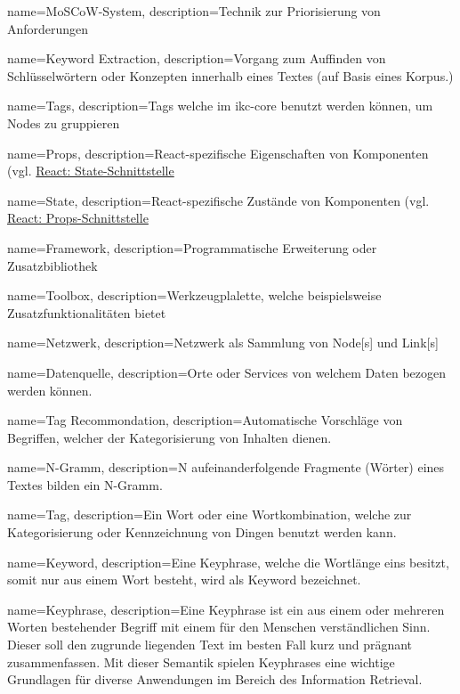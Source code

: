 {
    name=MoSCoW-System,
    description={Technik zur Priorisierung von Anforderungen}
    \cite{moscow:hardvard}
}

{
    name=Keyword Extraction,
    description={Vorgang zum Auffinden von Schlüsselwörtern oder Konzepten innerhalb eines Textes (auf Basis eines Korpus.)}
}

{
    name=Tags,
    description={Tags welche im \gls{ikc-core} benutzt werden können, um Nodes zu gruppieren}
}

{
    name=Props,
    description={React-spezifische Eigenschaften von Komponenten (vgl. \hyperref[props]{React: State-Schnittstelle}}
}

{
    name=State,
    description={React-spezifische Zustände von Komponenten (vgl. \hyperref[props]{React: Props-Schnittstelle}}
}

{
    name=Framework,
    description={Programmatische Erweiterung oder Zusatzbibliothek}
}

{
    name=Toolbox,
    description={Werkzeugplalette, welche beispielsweise Zu\-satz\-funk\-tio\-na\-li\-tät\-en bietet}
}

{
    name=Netzwerk,
    description={Netzwerk als Sammlung von \gls{Node}[s] und \gls{Link}[s]}
}

{
    name=Datenquelle,
    description={Orte oder Services von welchem Daten bezogen werden können.}
}

{
    name=Tag Recommondation,
    description={Automatische Vorschläge von Begriffen, welcher der Kategorisierung von Inhalten dienen.}
}

{
    name=N-Gramm,
    description={N aufeinanderfolgende Fragmente (Wörter) eines Textes bilden ein N-Gramm.}
}

{
    name=Tag,
    description={Ein Wort oder eine Wortkombination, welche zur Kate\-gor\-i\-sier\-ung oder Kenn\-zeich\-nung von Dingen benutzt werden kann.}
}

{
    name=Keyword,
    description={Eine \gls{Keyphrase}, welche die Wortlänge eins besitzt, somit nur aus einem Wort besteht, wird als Keyword bezeichnet.}
}

{
    name=Key\-phrase,
    description={Eine Keyphrase ist ein aus einem oder mehreren Worten bestehender Begriff mit einem für den Menschen verständlichen Sinn. Dieser soll den zugrunde liegenden Text im besten Fall kurz und prägnant zusammenfassen. Mit dieser Semantik  spielen Keyphrases eine wichtige Grundlagen für diverse Anwendungen im Bereich des Information Retrieval.}
}

